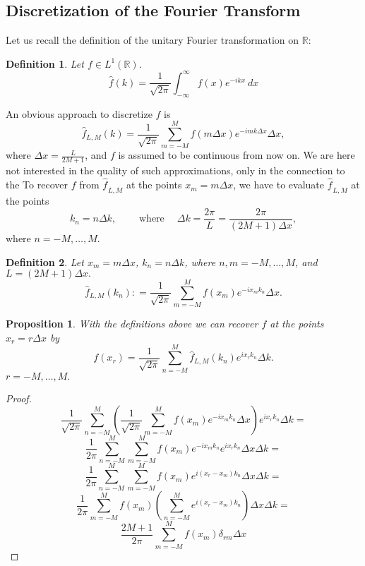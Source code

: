 \documentclass[12pt,a4paper]{article}
\newtheorem{prop}{Proposition}
\newtheorem{definition}{Definition}
\newcommand{\tmop}[1]{\ensuremath{\operatorname{#1}}}
\newcommand{\tmverbatim}[1]{{\ttfamily{#1}}}
\begin{document}
\begin{appendices}
\subsection{Discretization of the Fourier Transform}
Let us recall the definition of the unitary Fourier transformation on
$\mathbb{R}$:
\begin{definition}
  Let $f \in L^1 (\mathbb{R})$.
  \[ \hat{f} (k) = \frac{1}{\sqrt{2 \pi}} \int_{- \infty}^{\infty} f (x) e^{-
     ikx} \: d x \]
\end{definition}
An obvious approach to discretize $\hat{f}$ is
\[ \hat{f}_{L, M} (k) = \frac{1}{\sqrt{2 \pi}}  \sum_{m = - M}^M f (m \Delta
   x) e^{- imk \Delta x} \Delta x, \]
where $\Delta x = \frac{L}{2 M + 1}$, and $f$ is assumed to be continuous from
now on. We are here not interested in the quality of such approximations, only
in the connection to the \tmverbatim{DFT.} To recover $f$ from
$\widehat{f_{}}_{L, M}$ at the points $x_m = m \Delta x$, we have to evaluate
$\widehat{f_{}}_{L, M}$ at the points
\[ k_n = n \Delta k, \hspace{2em} \tmop{where} \hspace{1em} \Delta k = \frac{2
   \pi}{L} = \frac{2 \pi}{(2 M + 1) \Delta x}, \]
where $n = - M, \ldots, M.$
\
\begin{definition}
  Let $x_m = m \Delta x$, $k_n = n \Delta k$, where $n, m = - M, \ldots, M$,
  and $L = (2 M + 1) \Delta x.$
  \[ \hat{f}_{L, M} (k_n) : = \frac{1}{\sqrt{2 \pi}}  \sum_{m = - M}^M f (x_m)
     e^{- ix_m k_n} \Delta x. \]
\end{definition}
\begin{prop}
  With the definitions above we can recover $f$ at the points $x_r = r \Delta
  x$ by
  \[ f (x_r) = \frac{1}{\sqrt{2 \pi}}  \sum_{n = - M}^M \hat{f}_{L, M} (k_n)
     e^{ix_r k_n} \Delta k. \]
  $r = - M, \ldots, M.$
\end{prop}
\begin{proof}
  \[ \frac{1}{\sqrt{2 \pi}}  \sum_{n = - M}^M \left( \frac{1}{\sqrt{2 \pi}} 
     \sum_{m = - M}^M f (x_m) e^{- ix_m k_n} \Delta x \right) e^{ix_r k_n}
     \Delta k = \]
  \[ \frac{1}{2 \pi} \sum_{n = - M}^M \sum_{m = - M}^M f (x_m) e^{- ix_m k_n}
     e^{ix_r k_n} \Delta x \Delta k = \]
  \[ \frac{1}{2 \pi} \sum_{n = - M}^M \sum_{m = - M}^M f (x_m) e^{i (x_r -
     x_m) k_n} \Delta x \Delta k = \]
  \[ \frac{1}{2 \pi} \sum_{m = - M}^M f (x_m)  \left( \sum_{n = - M}^M e^{i
     (x_r - x_m) k_n} \right) \Delta x \Delta k = \]
  \[ \  \]
  \[ \frac{2 M + 1}{2 \pi} \sum_{m = - M}^M f (x_m) \delta_{r m} \Delta x
\]
\end{proof}
\end{appendices}
\end{document}
